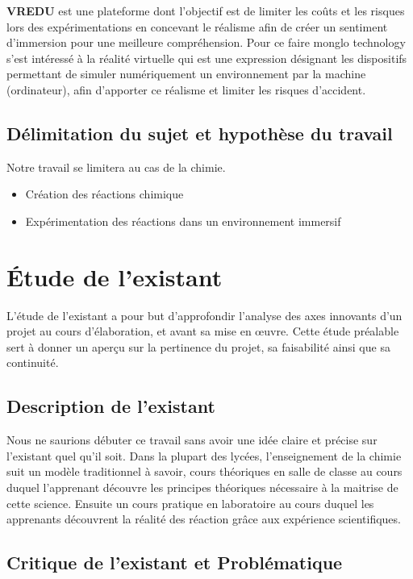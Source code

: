 \textbf{VREDU} est une plateforme dont l’objectif est de limiter les coûts et les risques lors des expérimentations en concevant le réalisme afin de créer un sentiment d’immersion pour une meilleure compréhension. Pour ce faire monglo technology s’est intéressé à la réalité virtuelle qui est une expression désignant les dispositifs permettant de simuler numériquement un environnement par la machine (ordinateur), afin d’apporter ce réalisme et limiter les risques d’accident.

\subsection{Délimitation du sujet et hypothèse du travail}

Notre travail se limitera au cas de la chimie.

\begin{itemize}
	\item Création des réactions chimique
	\item Expérimentation des réactions dans un environnement immersif
\end{itemize}

\section{Étude de l’existant}

L’étude de l’existant a pour but d'approfondir l'analyse des axes innovants d'un projet au cours d'élaboration, et avant sa mise en œuvre. Cette étude préalable sert à donner un aperçu sur la pertinence du projet, sa faisabilité ainsi que sa continuité.

\subsection{Description de l’existant}

Nous ne saurions débuter ce travail sans avoir une idée claire et précise sur l’existant quel qu’il soit. Dans la plupart des lycées, l’enseignement de la chimie suit un modèle traditionnel à savoir, cours théoriques en salle de classe au cours duquel l’apprenant découvre les principes théoriques nécessaire à la maitrise de cette science. Ensuite un cours pratique en laboratoire au cours duquel les apprenants découvrent la réalité des réaction grâce aux expérience scientifiques.


\subsection{Critique de l’existant et Problématique}

